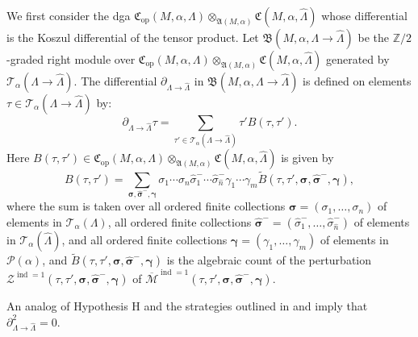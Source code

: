 \documentclass[JEP,XML,SOM,Unicode,NoFloatCountersInSection]{cedram}
\let\mathcal\mathscr
\let\ra\rightarrow
\newcommand{\opp}{\mathrm{op}}
\theoremstyle{plain}
\theoremstyle{definition}
\numberwithin{equation}{subsection}
\let\op\operatorname
\let\bs\boldsymbol
\begin{document}
We first consider the dga $\mathfrak{C}_{\opp}(M,\alpha,\Lambda) \otimes_{\mathfrak{A}(M,\alpha)} \mathfrak{C}(M,\alpha,\widehat{\Lambda})$ whose differential is the Koszul differential of the tensor product. Let $\mathfrak{B}(M,\alpha,\Lambda\ra\widehat{\Lambda})$ be the $\mathbb{Z}/2$-graded right module over $\mathfrak{C}_{\opp}(M,\alpha,\Lambda) \otimes_{\mathfrak{A}(M,\alpha)} \mathfrak{C}(M,\alpha,\widehat{\Lambda})$ generated by $\mathcal{T}_\alpha(\Lambda\ra\widehat{\Lambda})$.
The differential $\partial_{\Lambda\ra\widehat{\Lambda}}$ in $\mathfrak{B}(M,\alpha,\Lambda\ra\widehat{\Lambda})$ is defined on elements
$\tau \in \mathcal{T}_\alpha(\Lambda\ra\widehat{\Lambda})$ by:
\begin{equation}%
\partial_{\Lambda\ra\widehat{\Lambda}} \tau = \sum_{\tau' \in \mathcal{T}_\alpha(\Lambda\ra\widehat{\Lambda})} \tau' B(\tau,\tau').
\end{equation}
Here $B(\tau,\tau')\in \mathfrak{C}_{\opp}(M,\alpha,\Lambda) \otimes_{\mathfrak{A}(M,\alpha)} \mathfrak{C}(M,\alpha,\widehat{\Lambda})$ is given by
\begin{equation}%
B(\tau,\tau') = \sum
_{\bs\sigma,\widehat{\bs\sigma}^-,\bs\gamma} \sigma_1 \cdots\sigma_n\widehat{\sigma}^-_1\cdots\widehat{\sigma}^-_{\widehat{n}}
\gamma_1\cdots\gamma_m \widetilde{B}(\tau,\tau',\bs\sigma,\widehat{\bs\sigma}^-,\bs\gamma),
\end{equation}
where the sum is taken over all ordered finite collections $\bs\sigma=(\sigma_1,\dots,\sigma_n)$ of \hbox{elements} in $\mathcal{T}_\alpha(\Lambda)$, all ordered finite collections $\widehat{\bs\sigma}^-=(\widehat{\sigma}^-_1,\dots,\widehat{\sigma}^-_{\widehat{n}})$ of elements in $\mathcal{T}_\alpha(\widehat{\Lambda})$, and all ordered finite collections $\bs\gamma=(\gamma_1,\dots,\gamma_m)$ of elements in $\mathcal{P}(\alpha)$, and $\widetilde{B}(\tau,\tau',\bs\sigma,\widehat{\bs\sigma}^-,\bs\gamma)$ is the algebraic count of the perturbation $\mathcal{Z}^{\op{ind}=1}(\tau,\tau',\bs\sigma, \widehat{\bs\sigma}^-,\bs\gamma)$ of $\overline{\mathcal{M}}^{\op{ind}=1}(\tau,\tau',\bs\sigma, \widehat{\bs\sigma}^-, \bs\gamma)$.

An analog of Hypothesis H and the strategies outlined in \cite[\S 7]{BEE} and \cite[\S 2.8]{SFT} imply that $\partial_{\Lambda\ra\widehat{\Lambda}}^2 = 0$.
\end{document}
